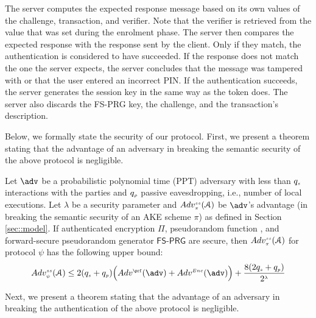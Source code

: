 The server computes the expected response message based on its own values of the challenge, transaction, and verifier. Note that the verifier is retrieved from the value that was set during the enrolment phase. The server then compares the expected response with the response sent by the client. Only if they match, the authentication is considered to have succeeded. If the response does not match the one the server expects, the server concludes that the message was tampered with or that the user entered an incorrect PIN. If the authentication succeeds, the server generates the session key in the same way as the token does.  The server also discards the FS-PRG key, the challenge, and the transaction's description.

%
Below, we formally state the security of our protocol.  First, we present a theorem stating that the advantage of an adversary in breaking the semantic security of the above protocol is negligible.  
\begin{theorem}[Semantic Security]
Let $\adv$ be a probabilistic polynomial time (PPT) adversary with less than $q_{\scriptscriptstyle s}$ interactions with the parties and $q_{\scriptscriptstyle p}$ passive eavesdropping, i.e., number of local executions. Let $\lambda$ be a security parameter and $Adv_{\scriptscriptstyle\pi}^{\scriptscriptstyle ss}(\mathcal{A})$ be  $\adv$'s advantage (in breaking the semantic security of an AKE scheme $\pi$) as defined in Section \ref{sec::model}. If authenticated encryption $\Pi$, pseudorandom function \prf,  and forward-secure pseudorandom generator  $\mathsf{FS\text{-}PRG}$ are secure, then $Adv_{\scriptscriptstyle\pi}^{\scriptscriptstyle ss}(\mathcal{A})$ for protocol $\psi$ has the following upper bound:  
%
\begin{equation*} 
Adv_{\sss \psi}^{\sss ss}(\A) \leq 2(q_{\sss s}+q_{\sss p})\Big(Adv^{\sss\prf}(\adv)+Adv^{\sss Enc}(\adv)\Big)+\frac{8(2q_{\sss s}+q_{\sss p})}{2^{\sss\lambda}}
\end{equation*}
%
\end{theorem}

Next, we present a theorem stating that the advantage of an adversary in breaking the authentication of the above protocol is negligible.  

